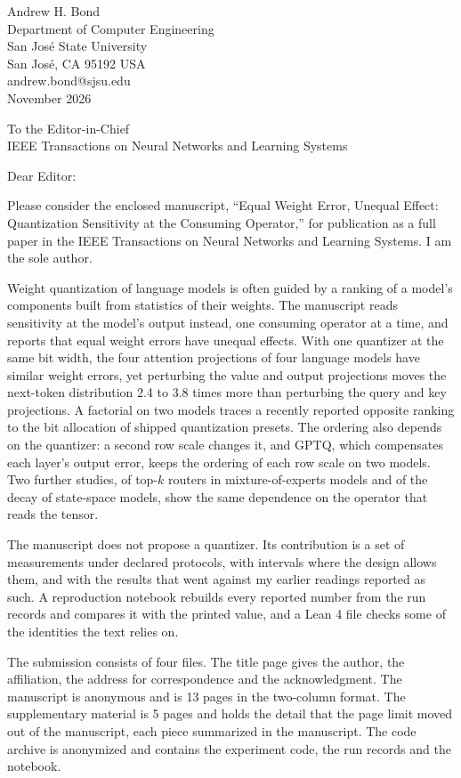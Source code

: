 \documentclass[11pt]{article}
\begin{document}
\begin{flushright}
Andrew H. Bond\\
Department of Computer Engineering\\
San Jos\'e State University\\
San Jos\'e, CA 95192 USA\\
andrew.bond@sjsu.edu\\[0.8em]
November 2026
\end{flushright}

To the Editor-in-Chief\\
IEEE Transactions on Neural Networks and Learning Systems

Dear Editor:

Please consider the enclosed manuscript, ``Equal Weight Error, Unequal Effect: Quantization
Sensitivity at the Consuming Operator,'' for publication as a full paper in the IEEE
Transactions on Neural Networks and Learning Systems. I am the sole author.

Weight quantization of language models is often guided by a ranking of a model's components
built from statistics of their weights. The manuscript reads sensitivity at the model's output
instead, one consuming operator at a time, and reports that equal weight errors have unequal
effects. With one quantizer at the same bit width, the four attention projections of four
language models have similar weight errors, yet perturbing the value and output projections
moves the next-token distribution 2.4 to 3.8 times more than perturbing the query and key
projections. A factorial on two models traces a recently reported opposite ranking to the bit
allocation of shipped quantization presets. The ordering also depends on the quantizer: a
second row scale changes it, and GPTQ, which compensates each layer's output error, keeps the
ordering of each row scale on two models. Two further studies, of top-$k$ routers in
mixture-of-experts models and of the decay of state-space models, show the same dependence on
the operator that reads the tensor.

The manuscript does not propose a quantizer. Its contribution is a set of measurements under
declared protocols, with intervals where the design allows them, and with the results that
went against my earlier readings reported as such. A reproduction notebook rebuilds every
reported number from the run records and compares it with the printed value, and a Lean 4 file
checks some of the identities the text relies on.

The submission consists of four files. The title page gives the author, the affiliation, the
address for correspondence and the acknowledgment. The manuscript is anonymous and is 13 pages
in the two-column format. The supplementary material is 5 pages and holds the detail that the
page limit moved out of the manuscript, each piece summarized in the manuscript. The code
archive is anonymized and contains the experiment code, the run records and the notebook.
\end{document}
